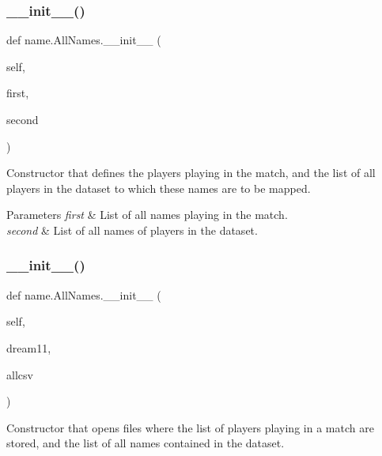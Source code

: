 \subsubsection{\texorpdfstring{\+\_\+\+\_\+init\+\_\+\+\_\+()}{\_\_init\_\_()}\hspace{0.1cm}{\footnotesize\ttfamily [1/2]}}
{\footnotesize\ttfamily def name.\+All\+Names.\+\_\+\+\_\+init\+\_\+\+\_\+ (\begin{DoxyParamCaption}\item[{}]{self,  }\item[{}]{first,  }\item[{}]{second }\end{DoxyParamCaption})}



Constructor that defines the players playing in the match, and the list of all players in the dataset to which these names are to be mapped. 


\begin{DoxyParams}{Parameters}
{\em first} & List of all names playing in the match. \\
\hline
{\em second} & List of all names of players in the dataset. \\
\hline
\end{DoxyParams}
\mbox{\label{classname_1_1AllNames_a28c4e3248f60738f445089b1fe8dfe42}} 
\subsubsection{\texorpdfstring{\+\_\+\+\_\+init\+\_\+\+\_\+()}{\_\_init\_\_()}\hspace{0.1cm}{\footnotesize\ttfamily [2/2]}}
{\footnotesize\ttfamily def name.\+All\+Names.\+\_\+\+\_\+init\+\_\+\+\_\+ (\begin{DoxyParamCaption}\item[{}]{self,  }\item[{}]{dream11,  }\item[{}]{allcsv }\end{DoxyParamCaption})}



Constructor that opens files where the list of players playing in a match are stored, and the list of all names contained in the dataset. 


